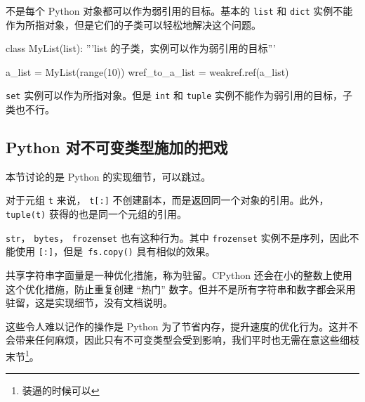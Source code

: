 不是每个 Python 对象都可以作为弱引用的目标。基本的 \texttt{list} 和 \texttt{dict} 实例不能作为所指对象，但是它们的子类可以轻松地解决这个问题。

\begin{python}
class MyList(list):
    '''list 的子类，实例可以作为弱引用的目标'''

a_list = MyList(range(10))
wref_to_a_list = weakref.ref(a_list)
\end{python}

\texttt{set} 实例可以作为所指对象。但是 \texttt{int} 和 \texttt{tuple} 实例不能作为弱引用的目标，子类也不行。

\subsection{Python 对不可变类型施加的把戏}

本节讨论的是 Python 的实现细节，可以跳过。

对于元组 \texttt{t} 来说， \texttt{t[:]} 不创建副本，而是返回同一个对象的引用。此外，\texttt{tuple(t)} 获得的也是同一个元组的引用。

\texttt{str}， \texttt{bytes}， \texttt{frozenset} 也有这种行为。其中 \texttt{frozenset} 实例不是序列，因此不能使用 \texttt{[:]}，但是\texttt{ fs.copy()} 具有相似的效果。

共享字符串字面量是一种优化措施，称为驻留。CPython 还会在小的整数上使用这个优化措施，防止重复创建 ``热门'' 数字。但并不是所有字符串和数字都会采用驻留，这是实现细节，没有文档说明。

这些令人难以记作的操作是 Python 为了节省内存，提升速度的优化行为。这并不会带来任何麻烦，因此只有不可变类型会受到影响，我们平时也无需在意这些细枝末节\footnote{装逼的时候可以}。

\newpage
